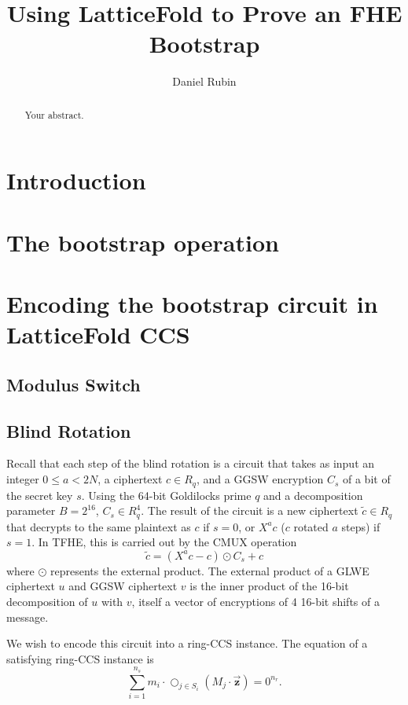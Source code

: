 \documentclass{article}
\title{Using LatticeFold to Prove an FHE Bootstrap}
\author{Daniel Rubin}
\begin{document}
\maketitle

\begin{abstract}
Your abstract.
\end{abstract}

\section{Introduction}


\section{The bootstrap operation}


\section{Encoding the bootstrap circuit in LatticeFold CCS}

\subsection{Modulus Switch}

\subsection{Blind Rotation}

Recall that each step of the blind rotation is a circuit that takes as input an integer $0\leq a < 2N$, a ciphertext $c \in R_q$, and a GGSW encryption $C_s$ of a bit of the secret key $s$. Using the 64-bit Goldilocks prime $q$ and a decomposition parameter $B=2^{16}$, $C_s \in R_q^4$. The result of the circuit is a new ciphertext $\tilde{c}\in R_q$ that decrypts to the same plaintext as $c$ if $s=0$, or $X^ac$ ($c$ rotated $a$ steps) if $s=1$. In TFHE, this is carried out by the CMUX operation
\begin{equation}
    \tilde{c} = (X^a c - c) \odot C_s + c
\end{equation}
where $\odot$ represents the external product. The external product of a GLWE ciphertext $u$ and GGSW ciphertext $v$ is the inner product of the 16-bit decomposition of $u$ with $v$, itself a vector of encryptions of 4 16-bit shifts of a message.

We wish to encode this circuit into a ring-CCS instance. The equation of a satisfying ring-CCS instance is
\begin{equation}
    \sum_{i=1}^{n_s} m_i \cdot\bigcirc_{j\in S_i} (M_j \cdot
        \overrightarrow{\boldsymbol{z}}) = 0^{n_r}.
\end{equation}
\end{document}
